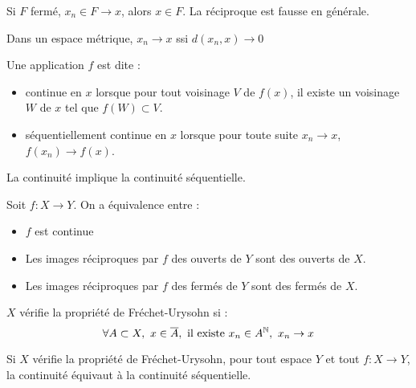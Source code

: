 \documentclass{cours}
\begin{document}
\begin{proposition}
    Si $F$ fermé, $x_{n} \in F \to x$, alors $x \in F$. La réciproque est fausse en générale.
\end{proposition}

\begin{theorem}
    Dans un espace métrique, $x_{n} \to x$ ssi $d(x_{n}, x) \to 0$
\end{theorem}

\begin{definition}
    Une application $f$ est dite :
    \begin{itemize}
        \item continue en $x$ lorsque pour tout voisinage $V$ de $f(x)$, il existe un voisinage $W$ de $x$ tel que $f(W) \subset V$.
        \item séquentiellement continue en $x$ lorsque pour toute suite $x_{n} \to x$, $f(x_{n}) \to f(x)$.
    \end{itemize}
\end{definition}

\begin{proposition}
    La continuité implique la continuité séquentielle.
\end{proposition}

\begin{proposition}
    Soit $f : X \rightarrow Y$. On a équivalence entre :
    \begin{itemize}
        \item $f$ est continue
        \item Les images réciproques par $f$ des ouverts de $Y$ sont des ouverts de $X$.
        \item Les images réciproques par $f$ des fermés de $Y$ sont des fermés de $X$.
    \end{itemize}
\end{proposition}

\begin{definition}
    $X$ vérifie la propriété de Fréchet-Urysohn si :
    \[\forall A \subset X,\ x \in \overline{A}, \text{ il existe } x_{n} \in A^{\mathbb{N}},\ x_{n} \to x\]
\end{definition}

\begin{theorem}
    Si $X$ vérifie la propriété de Fréchet-Urysohn, pour tout espace $Y$ et tout $f : X \rightarrow Y$, la continuité équivaut à la continuité séquentielle.
\end{theorem}
\end{document}
